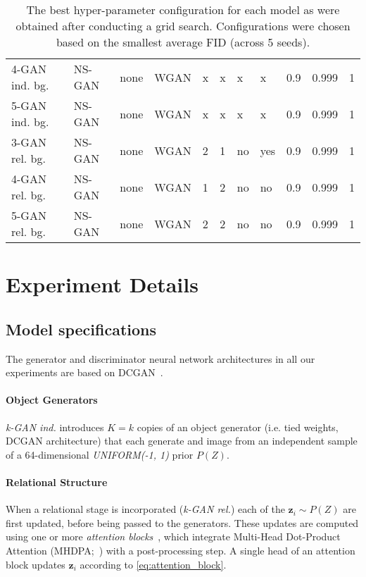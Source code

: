 \documentclass{article}
\begin{document}
\begin{table}[h]
\begin{tabular}{llllllllrrr}
 4-GAN ind. bg. &   NS-GAN &        none &    WGAN &      x &     x &  x &        x &    0.9 &  0.999 &       1 \\
 5-GAN ind. bg. &   NS-GAN &        none &    WGAN &      x &     x &  x &       x &    0.9 &  0.999 &       1 \\
 3-GAN rel. bg. &   NS-GAN &        none &    WGAN &      2 &     1 &  no &        yes &    0.9 &  0.999 &       1 \\
 4-GAN rel. bg. &   NS-GAN &        none &    WGAN &      1 &     2 &  no &       no &    0.9 &  0.999 &       1 \\
 5-GAN rel. bg. &   NS-GAN &        none &    WGAN &      2 &     2 &  no &       no &    0.9 &  0.999 &       1 \\
\bottomrule
\end{tabular}
\caption{The best hyper-parameter configuration for each model as were obtained after conducting a grid search.
Configurations were chosen based on the smallest average FID (across 5 seeds).}
\label{table:best_models}
\end{table}

\newpage
\section{Experiment Details}
\label{app:experiment_details}
\subsection{Model specifications}
The generator and discriminator neural network architectures in all our experiments are based on DCGAN~\citep{radford2015unsupervised}.

\paragraph{Object Generators}\emph{k-GAN ind.} introduces $K=k$ copies of an object generator (i.e. tied weights, DCGAN architecture) that each generate and image from an independent sample of a 64-dimensional \emph{UNIFORM(-1, 1)} prior $P(Z)$.

\paragraph{Relational Structure}
When a relational stage is incorporated (\emph{k-GAN rel.}) each of the $\bm{z}_i \sim P(Z)$ are first updated, before being passed to the generators. 
These updates are computed using one or more \emph{attention blocks}~\citep{zambaldi2018relational}, which integrate Multi-Head Dot-Product Attention (MHDPA;~\cite{vaswani2017attention}) with a post-processing step.
A single head of an attention block updates $\bm{z}_i$ according to \eqref{eq:attention_block}.
\end{document}
